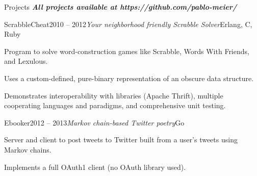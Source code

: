 \documentclass{resume} %
\begin{document}
\begin{rSection}{Projects}
\noindent{}\textbf{\textit{All projects available at https://github.com/pablo-meier/}}

\begin{rSubsection}{ScrabbleCheat}{2010 -- 2012}{\textit{Your neighborhood friendly Scrabble Solver}}{Erlang, C, Ruby}
\item Program to solve word-construction games like Scrabble, Words With Friends, and Lexulous.
\item Uses a custom-defined, pure-binary representation of an obscure data structure.
\item Demonstrates interoperability with libraries (Apache Thrift), multiple
    cooperating languages and paradigms, and comprehensive unit testing.
\end{rSubsection}

\begin{rSubsection}{Ebooker}{2012 -- 2013}{\textit{Markov chain-based Twitter poetry}}{Go}
\item Server and client to post tweets to Twitter built from a user's tweets using Markov chains.
\item Implements a full OAuth1 client (no OAuth library used).
\end{rSubsection}
\end{rSection}

\end{document}
